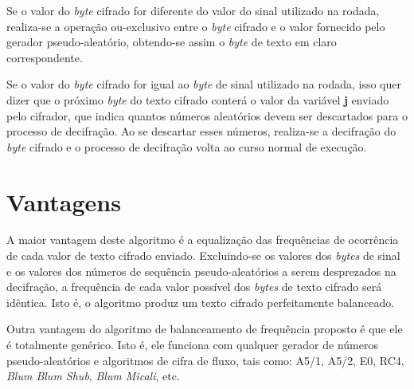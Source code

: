Se o valor do \textit{byte} cifrado for diferente do valor do sinal utilizado na rodada, realiza-se a operação ou-exclusivo entre o \textit{byte} cifrado e o valor fornecido pelo gerador pseudo-aleatório, obtendo-se assim o \textit{byte} de texto em claro correspondente.

Se o valor do \textit{byte} cifrado for igual ao \textit{byte} de sinal utilizado na rodada, isso quer dizer que o próximo \textit{byte} do texto cifrado conterá o valor da variável \textbf{j} enviado pelo cifrador, que indica quantos números aleatórios devem ser descartados para o processo de decifração. Ao se descartar esses números, realiza-se a decifração do \textit{byte} cifrado e o processo de decifração volta ao curso normal de execução.

\section{Vantagens}

A maior vantagem deste algoritmo é a equalização das frequências de ocorrência de cada valor de texto cifrado enviado. Excluindo-se os valores dos \textit{bytes} de sinal e os valores dos números de sequência pseudo-aleatórios a serem desprezados na decifração, a frequência de cada valor possível dos \textit{bytes} de texto cifrado será idêntica. Isto é, o algoritmo produz um texto cifrado perfeitamente balanceado.

Outra vantagem do algoritmo de balanceamento de frequência proposto é que ele é totalmente genérico.  Isto é, ele funciona com qualquer gerador de números pseudo-aleatórios e algoritmos de cifra de fluxo, tais como: A5/1, A5/2, E0, RC4, \textit{Blum Blum Shub}, \textit{Blum Micali}, etc.
